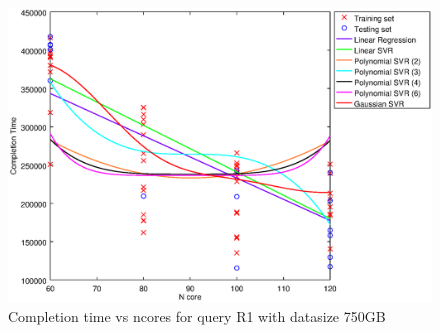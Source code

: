 
\begin {figure}[hbtp]
\centering
\includegraphics[width=\textwidth]{output/R1_750_ONLY_1_LINEAR_NCORE/plot_R1_750.eps}
\caption{Completion time vs ncores for query R1 with datasize 750GB}
\label{fig:only_1_linear_R1_750}
\end {figure}
